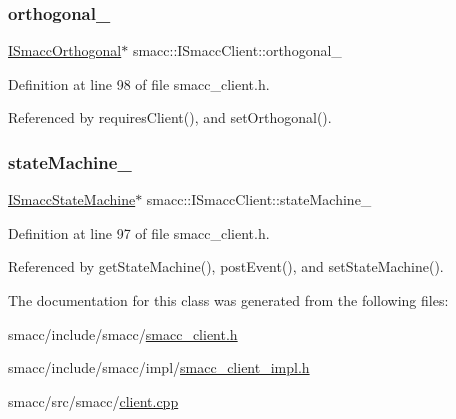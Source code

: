 \mbox{\label{classsmacc_1_1ISmaccClient_a571c7f672d9c90128b5498aefc27c136}} 
\subsubsection{\texorpdfstring{orthogonal\+\_\+}{orthogonal\_}}
{\footnotesize\ttfamily \hyperlink{classsmacc_1_1ISmaccOrthogonal}{I\+Smacc\+Orthogonal}$\ast$ smacc\+::\+I\+Smacc\+Client\+::orthogonal\+\_\+\hspace{0.3cm}{\ttfamily [private]}}



Definition at line 98 of file smacc\+\_\+client.\+h.



Referenced by requires\+Client(), and set\+Orthogonal().

\mbox{\label{classsmacc_1_1ISmaccClient_a926e4f2ae796def63d48dca389a48c47}} 
\subsubsection{\texorpdfstring{state\+Machine\+\_\+}{stateMachine\_}}
{\footnotesize\ttfamily \hyperlink{classsmacc_1_1ISmaccStateMachine}{I\+Smacc\+State\+Machine}$\ast$ smacc\+::\+I\+Smacc\+Client\+::state\+Machine\+\_\+\hspace{0.3cm}{\ttfamily [private]}}



Definition at line 97 of file smacc\+\_\+client.\+h.



Referenced by get\+State\+Machine(), post\+Event(), and set\+State\+Machine().



The documentation for this class was generated from the following files\+:\begin{DoxyCompactItemize}
\item 
smacc/include/smacc/\hyperlink{smacc__client_8h}{smacc\+\_\+client.\+h}\item 
smacc/include/smacc/impl/\hyperlink{smacc__client__impl_8h}{smacc\+\_\+client\+\_\+impl.\+h}\item 
smacc/src/smacc/\hyperlink{client_8cpp}{client.\+cpp}\end{DoxyCompactItemize}
